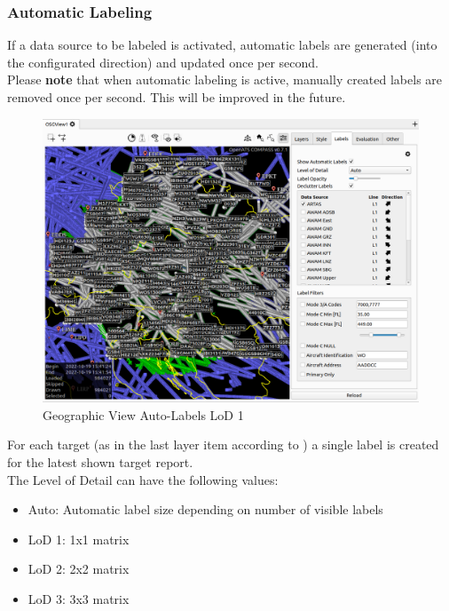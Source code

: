 \subsubsection{Automatic Labeling}

If a data source to be labeled is activated, automatic labels are generated (into the configurated direction) and updated once per second. \\

Please \textbf{note} that when automatic labeling is active, manually created labels are removed once per second. This will be improved in the future.

\begin{figure}[H]
    \hspace*{-2.5cm}
    \includegraphics[width=19cm,frame]{figures/geoview_label_lod1.png}
  \caption{Geographic View Auto-Labels LoD 1}
\end{figure}

For each target (as in the last layer item according to ) a single label is created for the latest shown target report. \\

The Level of Detail can have the following values:
\begin{itemize}
 \item Auto: Automatic label size depending on number of visible labels
 \item LoD 1: 1x1 matrix
 \item LoD 2: 2x2 matrix
 \item LoD 3: 3x3 matrix
\end{itemize} 
\ \\

